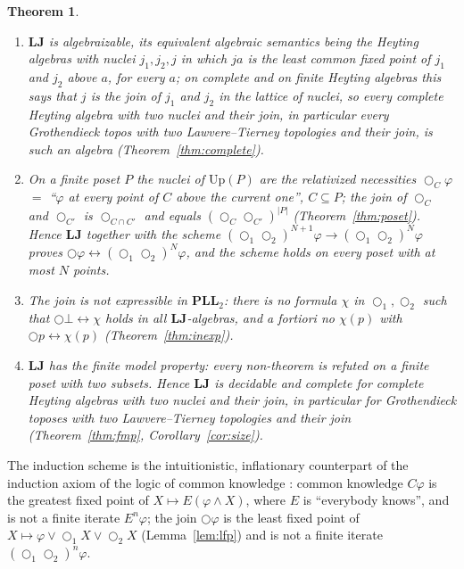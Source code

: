 \documentclass[11pt]{amsart}
\newtheorem{thm}{Theorem}[section]
\theoremstyle{definition}
\newcommand{\Up}{\mathrm{Up}}
\newcommand{\LLJ}{\mathbf{LJ}}
\newcommand{\PLLt}{\mathbf{PLL}_2}
\newcommand{\lax}{\bigcirc}
\newcommand{\laxa}{\bigcirc_1}
\newcommand{\laxb}{\bigcirc_2}
\begin{document}
\begin{thm}\label{thm:main}
\begin{enumerate}
\item[(a)] $\LLJ$ is algebraizable, its equivalent algebraic semantics being
the Heyting algebras with nuclei $j_1,j_2,j$ in which $ja$ is the least common
fixed point of $j_1$ and $j_2$ above $a$, for every $a$; on complete and on
finite Heyting algebras this says that $j$ is the join of $j_1$ and $j_2$ in
the lattice of nuclei, so every complete Heyting algebra with two nuclei and
their join, in particular every Grothendieck topos with two Lawvere--Tierney topologies and
their join, is such an algebra (Theorem~\ref{thm:complete}).
\item[(b)] On a finite poset $P$ the nuclei of $\Up(P)$ are the relativized
necessities $\lax_C\varphi$ $=$ ``$\varphi$ at every point of $C$ above the
current one'', $C\subseteq P$; the join of $\lax_C$ and $\lax_{C'}$ is
$\lax_{C\cap C'}$ and equals $(\lax_C\lax_{C'})^{|P|}$ (Theorem~\ref{thm:poset}).
Hence $\LLJ$ together with the scheme
$(\laxa\laxb)^{N+1}\varphi\to(\laxa\laxb)^N\varphi$ proves
$\lax\varphi\leftrightarrow(\laxa\laxb)^N\varphi$, and the scheme holds on
every poset with at most $N$ points.
\item[(c)] The join is not expressible in $\PLLt$: there is no formula $\chi$ in
$\laxa,\laxb$ such that $\lax\bot\leftrightarrow\chi$ holds in all
$\LLJ$-algebras, and a fortiori no $\chi(p)$ with
$\lax p\leftrightarrow\chi(p)$ (Theorem~\ref{thm:inexp}).
\item[(d)] $\LLJ$ has the finite model property: every non-theorem is refuted
on a finite poset with two subsets. Hence $\LLJ$ is decidable and complete for
complete Heyting algebras with two nuclei and their join, in particular for
Grothendieck toposes with two Lawvere--Tierney topologies and their join
(Theorem~\ref{thm:fmp}, Corollary~\ref{cor:size}).
\end{enumerate}
\end{thm}

The induction scheme is the intuitionistic, inflationary counterpart of the
induction axiom of the logic of common knowledge \cite{HM}: common knowledge
$C\varphi$ is the greatest fixed point of $X\mapsto E(\varphi\wedge X)$, where
$E$ is ``everybody knows'', and is not a finite iterate $E^n\varphi$; the join
$\lax\varphi$ is the least fixed point of $X\mapsto\varphi\vee\laxa X\vee\laxb X$
(Lemma~\ref{lem:lfp}) and is not a finite iterate $(\laxa\laxb)^n\varphi$.
\end{document}
